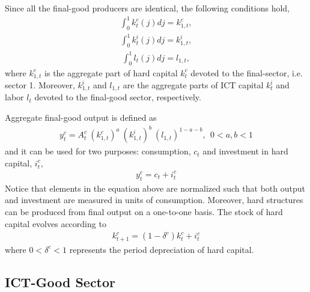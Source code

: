 \documentclass[12pt]{article}
\begin{document}
Since all the final-good producers are identical, the following conditions hold,
\begin{eqnarray}\label{equation:aggregation_hard_final}
\int_0^1 k^c_{t}(j) dj = k^c_{1,t},
\end{eqnarray}
\begin{eqnarray}\label{equation:aggregation_ICT_final}
\int_0^1 k^i_{t}(j) dj = k^i_{1,t}, 
\end{eqnarray}
\begin{eqnarray}\label{equation:aggregation_labor_final}
\int_0^1 l_{t}(j) dj = l_{1,t},
\end{eqnarray}
where $k^c_{1,t}$ is the aggregate part of hard capital $k^c_t$ devoted to the final-sector, i.e. sector 1. Moreover, $k^i_{1,t}$ and $l_{1,t}$ are the aggregate parts of ICT capital $k^i_{t}$ and labor $l_{t}$ devoted to the final-good sector, respectively. 


Aggregate final-good output is defined as
\begin{eqnarray}\label{equation:production_FINAL_aggregate}
y^c_t = A^c_t \ ( k^c_{1,t} )^a \ ( k^i_{1,t} )^b \ ( l_{1,t} )^{1-a-b}, \ \ 0 < a,b < 1
\end{eqnarray}
and it can be used for two purposes: consumption, $c_t$ and investment in hard capital, $i^c_t$,
\begin{eqnarray}\label{equation:resourceFINAL}
y^c_t = c_t + i^c_t
\end{eqnarray}
Notice that elements in the equation above are normalized such that both output and investment are measured in units of consumption. Moreover, hard structures can be produced from final output on a one-to-one basis. The stock of hard capital evolves according to
\begin{eqnarray}\label{equation:LOM_Hard}
k^c_{t+1} = (1 - \delta^c) k^c_t + i^c_t
\end{eqnarray}
where $0 < \delta^c < 1$ represents the period depreciation of hard capital.

\subsection{ICT-Good Sector}
\end{document}
